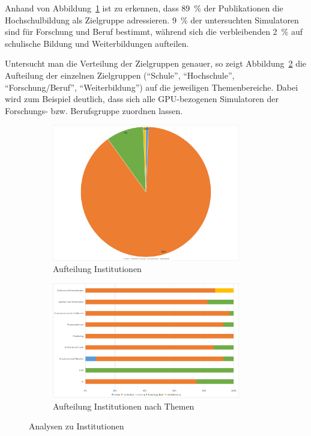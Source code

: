 Anhand von Abbildung~\ref{fig:9-institution} ist zu erkennen, dass 89~\% der Publikationen die Hochschulbildung als Zielgruppe adressieren. 9~\% der untersuchten Simulatoren sind für Forschung und Beruf bestimmt, während sich die verbleibenden 2~\% auf schulische Bildung und Weiterbildungen aufteilen.

Untersucht man die Verteilung der Zielgruppen genauer, so zeigt Abbildung~\ref{fig:10-institution-themen} die Aufteilung der einzelnen Zielgruppen (\enquote{Schule}, \enquote{Hochschule}, \enquote{Forschung/Beruf}, \enquote{Weiterbildung}) auf die jeweiligen Themenbereiche. Dabei wird zum Beispiel deutlich, dass sich alle GPU-bezogenen Simulatoren der Forschungs- bzw. Berufsgruppe zuordnen lassen.

\begin{figure}[!htbp]
    \centering
    \begin{subfigure}[b]{0.48\textwidth}
        \centering
        \includegraphics[width=0.90\textwidth]{graphics/9-institution2.png}
        \caption{Aufteilung Institutionen}
        \label{fig:9-institution}
    \end{subfigure}
    \hfill
    \begin{subfigure}[b]{0.48\textwidth}
        \centering
        \includegraphics[width=0.90\textwidth]{graphics/10-institution-themen.png}
        \caption{Aufteilung Institutionen nach Themen}
        \label{fig:10-institution-themen}
    \end{subfigure}
    \caption{Analysen zu Institutionen}
    \label{fig:institution-analysen}
\end{figure}

